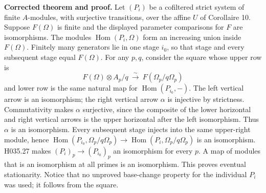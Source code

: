 \textbf{Corrected theorem and proof.} Let $(P_i)$ be a cofiltered
strict system of finite $A$-modules, with surjective transitions, over
the affine $U$ of Corollaire 10. Suppose $F(\Omega)$ is finite and
the displayed parameter comparisons for $F$ are isomorphisms. The
modules $\operatorname{Hom}(P_i,\Omega)$ form an increasing union
inside $F(\Omega)$. Finitely many generators lie in one stage $i_0$,
so that stage and every subsequent stage equal $F(\Omega)$.
For any $p,q$, consider the square whose upper row is
\[
 F(\Omega)\otimes A_p/q\ \xrightarrow\sim\ F(\Omega_p/q\Omega_p)
\]
and lower row is the same natural map for $\operatorname{Hom}(P_{i_0},-)$.
The left vertical arrow is an isomorphism; the right vertical arrow
$\alpha$ is injective by strictness. Commutativity makes $\alpha$
surjective, since the composite of the lower horizontal and right
vertical arrows is the upper horizontal after the left isomorphism.
Thus $\alpha$ is an isomorphism. Every subsequent stage injects into
the same upper-right module, hence
$\operatorname{Hom}(P_{i_0},\Omega_p/q\Omega_p)\to
\operatorname{Hom}(P_i,\Omega_p/q\Omega_p)$ is an isomorphism.
H035.27 makes $(P_i)_p\to(P_{i_0})_p$ an isomorphism for every $p$.
A map of modules that is an isomorphism at all primes is an isomorphism.
This proves eventual stationarity. Notice that no unproved base-change
property for the individual $P_i$ was used; it follows from the square.

